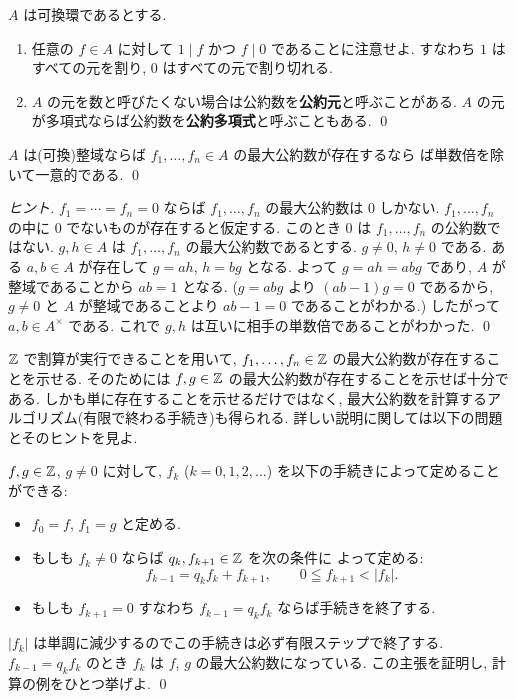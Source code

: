 \documentclass[12pt,twoside]{jarticle}
\begin{document}
\begin{rem}
 $A$ は可換環であるとする.
 \begin{enumerate}
 \item 任意の $f\in A$ に対して $1\mid f$ かつ $f\mid 0$ であることに注意せよ.
  すなわち $1$ はすべての元を割り, $0$ はすべての元で割り切れる.
 \item $A$ の元を数と呼びたくない場合は公約数を{\bf 公約元}と呼ぶことがある.
  $A$ の元が多項式ならば公約数を{\bf 公約多項式}と呼ぶこともある.
 \qed
 \end{enumerate}
\end{rem}


\begin{question}[最大公約数の単数倍を除いた一意性]
 $A$ は(可換)整域ならば $f_1,\ldots,f_n\in A$ の最大公約数が存在するなら
 ば単数倍を除いて一意的である.
 \qed
\end{question}

\begin{proof}[ヒント]
 $f_1=\cdots=f_n=0$ ならば $f_1,\ldots,f_n$ の最大公約数は $0$ しかない.
 $f_1,\ldots,f_n$ の中に $0$ でないものが存在すると仮定する.
 このとき $0$ は $f_1,\ldots,f_n$ の公約数ではない.
 $g,h\in A$ は $f_1,\ldots,f_n$ の最大公約数であるとする.
 $g\ne 0$, $h\ne 0$ である.
 ある $a,b\in A$ が存在して $g=ah$, $h=bg$ となる.
 よって $g=ah=abg$ であり, $A$ が整域であることから $ab=1$ となる.
 ($g=abg$ より $(ab-1)g=0$ であるから, %
 $g\ne 0$ と $A$ が整域であることより $ab-1=0$ であることがわかる.)
 したがって $a,b\in A^\times$ である.
 これで $g,h$ は互いに相手の単数倍であることがわかった.
 \qed
\end{proof}


${\mathbb Z}$ で割算が実行できることを用いて, 
$f_1,\ldots,f_n\in{\mathbb Z}$ の最大公約数が存在することを示せる.
そのためには $f,g\in{\mathbb Z}$ の最大公約数が存在することを示せば十分である.
しかも単に存在することを示せるだけではなく, 
最大公約数を計算するアルゴリズム(有限で終わる手続き)も得られる.
詳しい説明に関しては以下の問題とそのヒントを見よ.

\begin{question}
\label{q:Euclidean-algorithm-1-Z}
  $f,g\in{\mathbb Z}$, $g\ne 0$ に対して, 
  $f_k$ ($k=0,1,2,\dots$) を以下の手続きによって定めることができる:
  \begin{itemize}
  \item $f_0=f$, $f_1=g$ と定める.
  \item もしも $f_k\ne 0$ ならば $q_k, f_{k+1}\in {\mathbb Z}$ を次の条件に
    よって定める:
    \begin{equation*}
      f_{k-1} = q_k f_k + f_{k+1}, \qquad 0\leqq f_{k+1} < |f_k|.
    \end{equation*}
  \item もしも $f_{k+1}=0$ すなわち $f_{k-1}=q_kf_k$ ならば手続きを終了する.
  \end{itemize}
  $|f_k|$ は単調に減少するのでこの手続きは必ず有限ステップで終了する.
  $f_{k-1}=q_kf_k$ のとき $f_k$ は $f$, $g$ の最大公約数になっている.
  この主張を証明し, 計算の例をひとつ挙げよ.
  \qed
\end{question}
\end{document}
